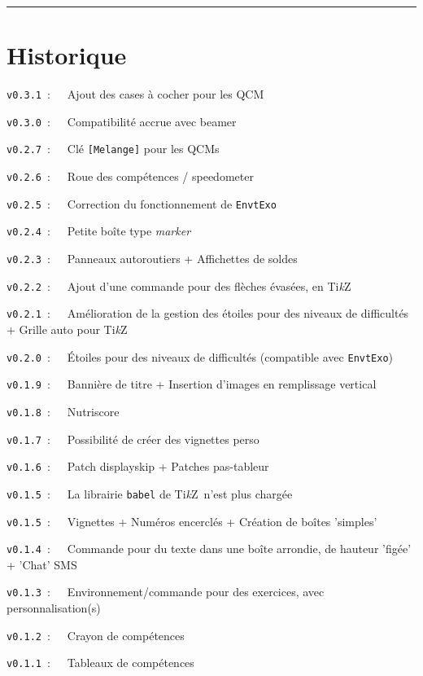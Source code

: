 \documentclass[french,11pt,a4paper]{article}
\providecommand\tikzlogo{Ti\textit{k}Z}
\let\TikZ\tikzlogo
\begin{document}
\tableofcontents

\vspace*{5mm}

\hrule

\pagebreak

\section{Historique}

\verb|v0.3.1|~:~~~Ajout des cases à cocher pour les \textsf{QCM}

\verb|v0.3.0|~:~~~Compatibilité accrue avec \textsf{beamer}

\verb|v0.2.7|~:~~~Clé \texttt{[Melange]} pour les QCMs

\verb|v0.2.6|~:~~~Roue des compétences / speedometer

\verb|v0.2.5|~:~~~Correction du fonctionnement de \texttt{EnvtExo}

\verb|v0.2.4|~:~~~Petite boîte type \textit{marker}

\verb|v0.2.3|~:~~~Panneaux autoroutiers + Affichettes de soldes

\verb|v0.2.2|~:~~~Ajout d'une commande pour des flèches évasées, en \TikZ\

\verb|v0.2.1|~:~~~Amélioration de la gestion des étoiles pour des niveaux de difficultés + Grille auto pour \TikZ\

\verb|v0.2.0|~:~~~Étoiles pour des niveaux de difficultés (compatible avec \texttt{EnvtExo})

\verb|v0.1.9|~:~~~Bannière de titre + Insertion d'images en remplissage vertical

\verb|v0.1.8|~:~~~Nutriscore

\verb|v0.1.7|~:~~~Possibilité de créer des vignettes \textsf{perso}

\verb|v0.1.6|~:~~~Patch \textsf{displayskip} + Patches \textsf{pas-tableur}

\verb|v0.1.5|~:~~~La librairie \texttt{babel} de \TikZ\ n'est plus chargée

\verb|v0.1.5|~:~~~Vignettes + Numéros encerclés + Création de boîtes 'simples'

\verb|v0.1.4|~:~~~Commande pour du texte dans une boîte arrondie, de hauteur 'figée' + 'Chat' SMS

\verb|v0.1.3|~:~~~Environnement/commande pour des exercices, avec personnalisation(s)

\verb|v0.1.2|~:~~~Crayon de compétences

\verb|v0.1.1|~:~~~Tableaux de compétences
\end{document}
